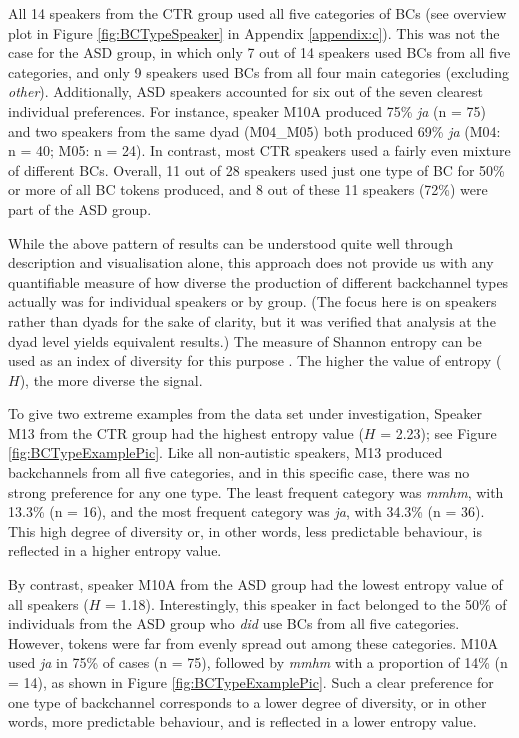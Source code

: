 \hspace{-2.4pt}All 14 speakers from the CTR group used all five categories of BCs (see overview plot in Figure \ref{fig:BCTypeSpeaker} in Appendix \ref{appendix:c}). This was not the case for the ASD group, in which only 7 out of 14 speakers used BCs from all five categories, and only 9 speakers used BCs from all four main categories (excluding \emph{other}). Additionally, ASD speakers accounted for six out of the seven clearest individual preferences. For instance, speaker M10A produced 75\% \emph{ja} (n = 75) and two speakers from the same dyad (M04\_M05) both produced 69\% \emph{ja} (M04: n = 40; M05: n = 24). In contrast, most CTR speakers used a fairly even mixture of different BCs. Overall, 11 out of 28 speakers used just one type of BC for 50\% or more of all BC tokens produced, and 8 out of these 11 speakers (72\%) were part of the ASD group.

\label{BCFP_BC_results_BCType_entropy}

While the above pattern of results can be understood quite well through description and visualisation alone, this approach does not provide us with any quantifiable measure of how diverse the production of different backchannel types actually was for individual speakers or by group. (The focus here is on speakers rather than dyads for the sake of clarity, but it was verified that analysis at the dyad level yields equivalent results.) The measure of Shannon entropy can be used as an index of diversity for this purpose \citep{shannonMathematicalTheoryCommunication1948}. The higher the value of entropy (\(H\)), the more diverse the signal.

To give two extreme examples from the data set under investigation, Speaker M13 from the CTR group had the highest entropy value (\(H\) = 2.23); see Figure \ref{fig:BCTypeExamplePic}. Like all non-autistic speakers, M13 produced backchannels from all five categories, and in this specific case, there was no strong preference for any one type. The least frequent category was \emph{mmhm}, with 13.3\% (n = 16), and the most frequent category was \emph{ja}, with 34.3\% (n = 36).  This high degree of diversity or, in other words, less predictable behaviour, is reflected in a higher entropy value.

By contrast, speaker M10A from the ASD group had the lowest entropy value of all speakers (\(H\) = 1.18). Interestingly, this speaker in fact belonged to the 50\% of individuals from the ASD group who \emph{did} use BCs from all five categories. However, tokens were far from evenly spread out among these categories. M10A used \emph{ja} in 75\% of cases (n = 75), followed by \emph{mmhm} with a proportion of 14\% (n = 14), as shown in Figure \ref{fig:BCTypeExamplePic}. Such a clear preference for one type of backchannel corresponds to a lower degree of diversity, or in other words, more predictable behaviour, and is reflected in a lower entropy value.



